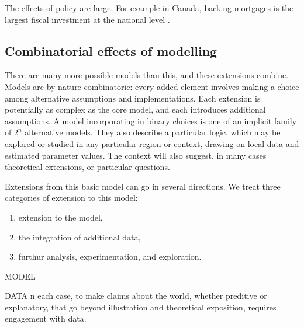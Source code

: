The effects of policy are large. For example in Canada, backing mortgages is the largest fiscal investment at the national level \cite{nemtinFinancializationHousingSocial2021}.


\subsection{Combinatorial effects of modelling}

There are many more possible models than this, and these extensions combine. Models are by nature combinatoric: every added element involves making a choice among alternative assumptions and implementations. Each extension is potentially as complex as the core model, and each introduces additional assumptions.  A model incorporating in binary choices is one of an implicit family of $2^n$ alternative models. 
They also describe a particular logic, which may be explored or studied in any particular region or context, drawing on local data and estimated parameter values. The context will also suggest, in many cases theoretical extensions, or particular questions.



Extensions from this basic model can go in several directions. We treat three categories of extension to this model:

\begin{enumerate}
    \item extension to the model, 
    \item the integration of additional data, 
    \item furthur analysis, experimentation, and exploration.
\end{enumerate}

MODEL

DATA
n each case, to make claims about the world, whether preditive or explanatory, that go beyond illustration and 
theoretical exposition, requires engagement with data.  %


